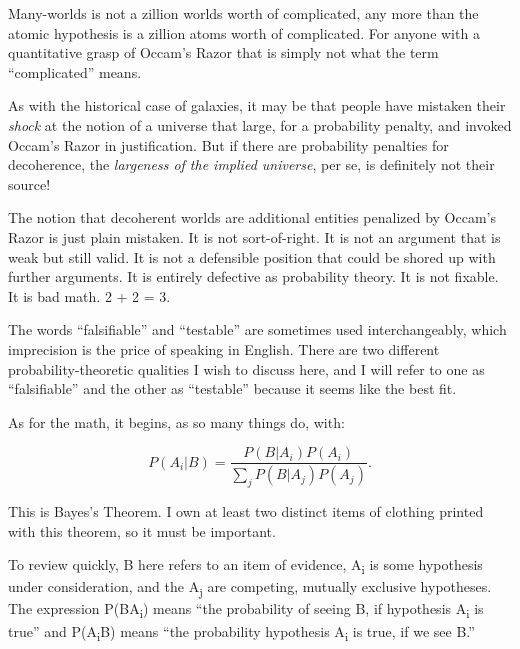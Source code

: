 {
 Many-worlds is not a zillion worlds worth of complicated, any more
than the atomic hypothesis is a zillion atoms worth of complicated. For
anyone with a quantitative grasp of Occam's Razor that
is simply not what the term
``complicated'' means.}

{
 As with the historical case of galaxies, it may be that people
have mistaken their \textit{shock} at the notion of a universe that
large, for a probability penalty, and invoked Occam's
Razor in justification. But if there are probability penalties for
decoherence, the \textit{largeness of the implied universe}, per se, is
definitely not their source!}

{
 The notion that decoherent worlds are additional entities
penalized by Occam's Razor is just plain mistaken. It
is not sort-of-right. It is not an argument that is weak but still
valid. It is not a defensible position that could be shored up with
further arguments. It is entirely defective as probability theory. It
is not fixable. It is bad math. 2 + 2 = 3.}

\myendsectiontext


{
 The words ``falsifiable'' and
``testable'' are sometimes used
interchangeably, which imprecision is the price of speaking in English.
There are two different probability-theoretic qualities I wish to
discuss here, and I will refer to one as
``falsifiable'' and the other as
``testable'' because it seems like
the best fit.}

{
 As for the math, it begins, as so many things do, with:}

\begin{equation*}
  P(A_i|B) = \frac{P(B|A_i)P(A_i)}
  {\sum_j P(B|A_j)P(A_j)}.
\end{equation*}


\bigskip

{
 This is Bayes's Theorem. I own at least two
distinct items of clothing printed with this theorem, so it must be
important. }

{
 To review quickly, B here refers to an item of evidence,
A\textsubscript{i} is some hypothesis under consideration, and the
A\textsubscript{j} are competing, mutually exclusive hypotheses. The
expression P(B{\textbar}A\textsubscript{i}) means
``the probability of seeing B, if hypothesis
A\textsubscript{i} is true'' and
P(A\textsubscript{i}{\textbar}B) means ``the
probability hypothesis A\textsubscript{i} is true, if we see
B.''}

